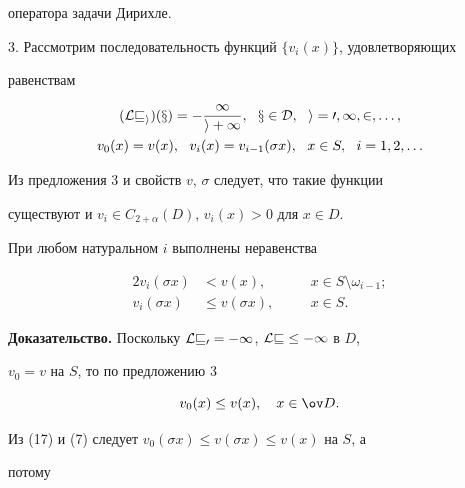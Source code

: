 оператора задачи Дирихле. 


\medskip 


 


3. Рассмотрим последовательность функций $\{v_i(x)\}$, удовлетворяющих 


равенствам 


\begin{gather} 


(\cal L v_i)(x)=-\frac{1}{i+1},\ \ x\in D,\ \ i=0,1,2,\dotsc,\\ 


v_0(x)=v(x),\ \ v_i(x)=v_{i-1}(\sigma x), 


\ \ x\in S,\ \ i=1,2,\dotsc 


\end{gather} 


Из предложения 3 и свойств $v$, $\sigma$ следует, что такие функции 


существуют и $v_i\in C_{2+\alpha}(D)$, $v_i(x)>0$ для $x\in D$. 


 


\begin{prop} 


При любом натуральном $i$ выполнены неравенства 


\begin{alignat}{2} 


v_i(\sigma x)&<v(x), &\quad &x\in S\setminus\omega_{i-1};\\ 


v_i(\sigma x)&\le v(\sigma x), &\quad & x\in S. 


\end{alignat} 


\end{prop} 


 


{\bf Доказательство.} Поскольку $\cal L v_0=-1$, $\cal L v\le-1$ в $D$, 


$v_0=v$ на $S$, то по предложению 3 


\begin{equation} 


v_0(x)\le v(x),\quad x\in\ov D. 


\end{equation} 


Из (17) и (7) следует $v_0(\sigma x)\le v(\sigma x)\le v(x)$ на $S$, а 


потому 


